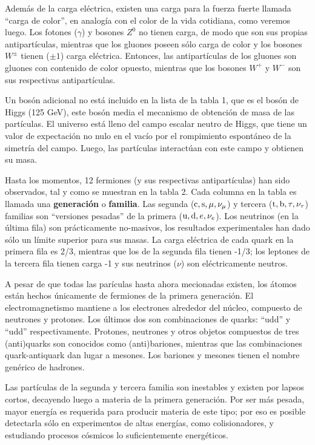 Además de la carga eléctrica, existen una carga para la fuerza fuerte llamada ``carga de color'', en analogía con el color de la vida cotidiana, como veremos luego. Los fotones ($\gamma$) y bosones $Z^0$ no tienen carga, de modo que son sus propias antipartículas, mientras que los gluones poseen sólo carga de color y los bosones $W^\pm$ tienen ($\pm 1$) carga eléctrica. Entonces, las antipartículas de los gluones son gluones con contenido de color opuesto, mientras que los bosones $W^+$ y $W^-$ son sus respectivas antipartículas.

Un bosón adicional no está incluido en la lista de la tabla 1, que es el bosón de Higgs (125 GeV), este bosón media el mecanismo de obtención de masa de las partículas. El universo está lleno del campo escalar neutro de Higgs, que tiene un valor de expectación no nulo en el vacío por el rompimiento espontáneo de la simetría del campo. Luego, las partículas interactúan con este campo y obtienen su masa. 

Hasta los momentos, 12 fermiones (y sus respectivas antipartículas) han sido observados, tal y como se muestran en la tabla 2. Cada columna en la tabla es llamada una \textbf{generación} o \textbf{familia}. Las segunda (${\mathrm c},{\mathrm s},\mu,\nu_\mu$) y tercera (${\mathrm t},{\mathrm b},\tau,\nu_\tau$) familias son ``versiones pesadas'' de la primera (${\mathrm u},{\mathrm d},e,\nu_e$). Los neutrinos (en la última fila) son prácticamente no-masivos, los resultados experimentales han dado sólo un límite superior para sus masas. La carga eléctrica de cada quark en la primera fila es 2/3, mientras que los de la segunda fila tienen -1/3; los leptones de la tercera fila tienen carga -1 y sus neutrinos ($\nu$) son eléctricamente neutros.

A pesar de que todas las parículas hasta ahora mecionadas existen, los átomos están hechos únicamente de fermiones de la primera generación. El electromagnetismo mantiene a los electrones alrededor del núcleo, compuesto de neutrones y protones. Los últimos dos son combinaciones de quarks: ``udd'' y ``udd'' respectivamente. Protones, neutrones y otros objetos compuestos de tres (anti)quarks son conocidos como (anti)bariones, mientras que las combinaciones quark-antiquark dan lugar a mesones. Los bariones y mesones tienen el nombre genérico de hadrones.

Las partículas de la segunda y tercera familia son inestables y existen por lapsos cortos, decayendo luego a materia de la primera generación. Por ser más pesada, mayor energía es requerida para producir materia de este tipo; por eso es posible detectarla sólo en experimentos de altas energías, como colisionadores, y estudiando procesos cósmicos lo suficientemente energéticos.


